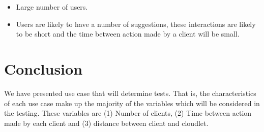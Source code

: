 \begin{itemize}
\item Large number of users.
\item Users are likely to have a number of suggestions, these interactions are likely to be short and the time between action made by a client will be small.
\end{itemize}

\section{Conclusion}
We have presented use case that will determine tests. That is, the characteristics of each use case make up the majority of the variables which will be considered in the testing. These variables are (1) Number of clients, (2) Time between action made by each client and (3) distance between client and cloudlet.


